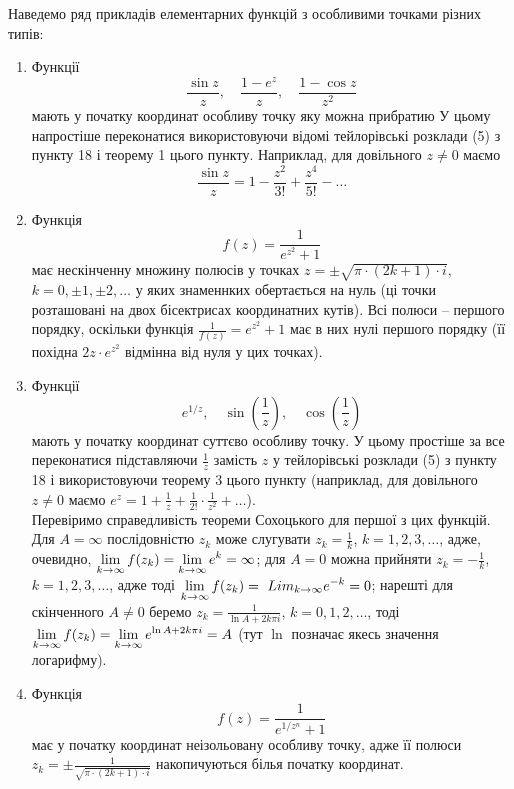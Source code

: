 Наведемо ряд прикладів елементарних функцій з особливими точками різних типів:
\begin{enumerate}
	\item Функції 
	\begin{equation*}
		\frac{\sin z}{z}, \quad \frac{1 - e^z}{z}, \quad \frac{1 - \cos z}{z^2}
	\end{equation*}
	мають у початку координат особливу точку яку можна прибратию У цьому напростіше переконатися використовуючи відомі тейлорівські розклади (5) з пункту 18 і теорему 1 цього пункту. Наприклад, для довільного $z \ne 0$ маємо 
	\begin{equation*}
		\frac{\sin z}{z} = 1 - \frac{z^2}{3!} + \frac{z^4}{5!} - \ldots
	\end{equation*}
	\item Функція 
	\begin{equation*}
		f(z) = \frac{1}{e^{z^2} + 1}
	\end{equation*}
	має нескінченну множину полюсів у точках $z = \pm \sqrt{\pi \cdot (2k + 1) \cdot i}$, $k = 0, \pm 1, \pm 2, \ldots$ у яких знаменнких обертається на нуль (ці точки розташовані на двох бісектрисах координатних кутів). Всі полюси -- першого порядку, оскільки функція $\frac{1}{f(z)} = e^{z^2} + 1$ має в них нулі першого порядку (її похідна $2 z \cdot e^{z^2}$ відмінна від нуля у цих точках).
	\item Функції
	\begin{equation*}
		e^{1 / z}, \quad \sin \left( \frac{1}{z} \right), \quad \cos \left( \frac{1}{z} \right)
	\end{equation*}
	мають у початку координат суттєво особливу точку. У цьому простіше за все переконатися підставляючи $\frac{1}{z}$ замість $z$ у тейлорівські розклади (5) з пункту 18 і використовуючи теорему 3 цього пункту (наприклад, для довільного $z \ne 0$ маємо $e^z = 1 + \frac{1}{z} + \frac{1}{2!} \cdot \frac{1}{z^2} + \ldots$). \\

	Перевіримо справедливість теореми Сохоцького для першої з цих функцій. Для $A = \infty$ послідовністю $z_k$ може слугувати $z_k = \frac{1}{k}$, $k = 1, 2, 3, \ldots$, адже, очевидно, $\displaystyle\lim\limits_{k \to \infty} f(z_k) = \displaystyle\lim\limits_{k \to \infty} e^k = \infty$; для $A = 0$ можна прийняти $z_k = - \frac{1}{k}$, $k = 1, 2, 3, \ldots$, адже тоді $\Lim_{k \to \infty} f(z_k) =\ Lim_{k \to \infty} e^{-k} = 0$; нарешті для скінченного $A \ne 0$ беремо $z_k = \frac{1}{\ln A + 2 k \pi i}$, $k = 0, 1, 2, \ldots$, тоді $\displaystyle\lim\limits_{k \to \infty} f(z_k) = \displaystyle\lim\limits_{k \to \infty} e^{\ln A + 2 k \pi i} = A$ (тут $\ln$ позначає якесь значення логарифму).

	\item Функція
	\begin{equation*}
		f(z) = \frac{1}{e^{1 / z^n} + 1}
	\end{equation*}
	має у початку координат неізольовану особливу точку, адже її полюси $z_k = \pm \frac{1}{\sqrt{\pi \cdot (2 k + 1) \cdot i}}$ накопичуються білья початку координат.
\end{enumerate}

